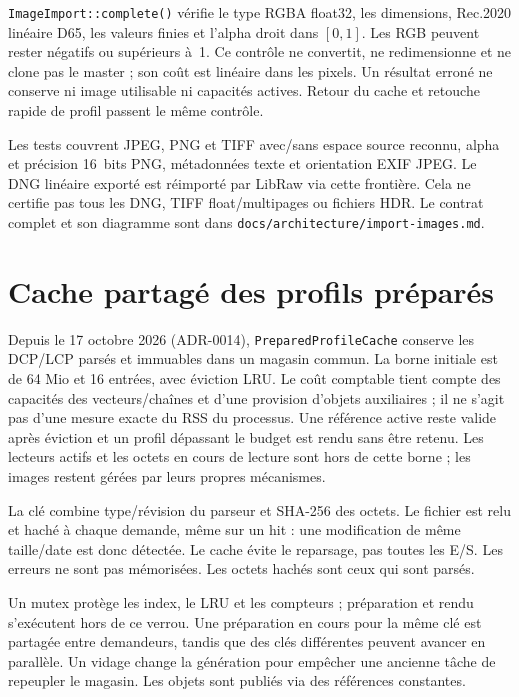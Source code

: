 \texttt{ImageImport::complete()} vérifie le type RGBA float32, les dimensions,
Rec.2020 linéaire D65, les valeurs finies et l'alpha droit dans $[0,1]$.
Les RGB peuvent rester négatifs ou supérieurs à~1. Ce contrôle ne convertit,
ne redimensionne et ne clone pas le master ; son coût est linéaire dans les
pixels. Un résultat erroné ne conserve ni image utilisable ni capacités actives.
Retour du cache et retouche rapide de profil passent le même contrôle.

Les tests couvrent JPEG, PNG et TIFF avec/sans espace source reconnu, alpha et
précision 16~bits PNG, métadonnées texte et orientation EXIF JPEG. Le DNG
linéaire exporté est réimporté par LibRaw via cette frontière. Cela ne certifie
pas tous les DNG, TIFF float/multipages ou fichiers HDR. Le contrat complet et
son diagramme sont dans \texttt{docs/architecture/import-images.md}.

\section{Cache partagé des profils préparés}

Depuis le 17 octobre 2026 (ADR-0014), \texttt{PreparedProfileCache} conserve
les DCP/LCP parsés et immuables dans un magasin commun. La borne initiale est
de 64 Mio et 16 entrées, avec éviction LRU. Le coût comptable tient compte des
capacités des vecteurs/chaînes et d'une provision d'objets auxiliaires ; il
ne s'agit pas d'une mesure exacte du RSS du processus. Une référence active
reste valide après éviction et un profil dépassant le budget est rendu sans
être retenu. Les lecteurs actifs et les octets en cours de lecture sont hors
de cette borne ; les images restent gérées par leurs propres mécanismes.

La clé combine type/révision du parseur et SHA-256 des octets. Le fichier est
relu et haché à chaque demande, même sur un hit : une modification de même
taille/date est donc détectée. Le cache évite le reparsage, pas toutes les E/S.
Les erreurs ne sont pas mémorisées. Les octets hachés sont ceux qui sont parsés.

Un mutex protège les index, le LRU et les compteurs ; préparation et rendu
s'exécutent hors de ce verrou. Une préparation en cours pour la même clé est
partagée entre demandeurs, tandis que des clés différentes peuvent avancer
en parallèle. Un vidage change la génération pour empêcher une ancienne tâche
de repeupler le magasin. Les objets sont publiés via des références constantes.

